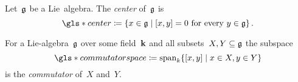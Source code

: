 \begin{definition}
  Let~$\mathfrak{g}$ be a Lie~algebra.
  The \emph{center} of~$\mathfrak{g}$ is
  \[
    \gls*{center}
    \defined
    \{
      x \in \glie
    \suchthat
      \text{$[x,y] = 0$ for every~$y \in \glie$}
    \}  \,.
  \]
\end{definition}


\begin{definition}
  For a Lie-algebra~$\mathfrak{g}$ over some field~$\mathbf{k}$ and all subsets~$X, Y \subseteq \mathfrak{g}$ the subspace
  \[
    \gls*{commutator space}
    \defined
    \vspan_k
    \{
      [x,y]
    \suchthat
      x \in X,
      y \in Y
    \}
  \]
  is the \emph{commutator} of~$X$ and~$Y$.
\end{definition}
% 
% 
% 
% 
% 
% 
% 
% 
% 
% 
